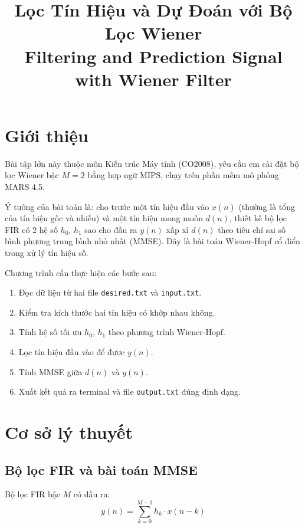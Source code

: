\documentclass[twoside,final]{hcmut-report}
\title{Lọc Tín Hiệu và Dự Đoán với Bộ Lọc Wiener\\
       \large Filtering and Prediction Signal with Wiener Filter}
\begin{document}
\coverpage%

\clearpage

\tableofcontents
\clearpage

\section{Giới thiệu}

Bài tập lớn này thuộc môn Kiến trúc Máy tính (CO2008), yêu cầu em
cài đặt bộ lọc Wiener bậc $M = 2$ bằng hợp ngữ MIPS, chạy trên phần mềm
mô phỏng MARS 4.5.

Ý tưởng của bài toán là: cho trước một tín hiệu đầu vào $x(n)$ (thường là
tổng của tín hiệu gốc và nhiễu) và một tín hiệu mong muốn $d(n)$, thiết kế
bộ lọc FIR có 2 hệ số $h_0$, $h_1$ sao cho đầu ra $y(n)$ xấp xỉ $d(n)$
theo tiêu chí sai số bình phương trung bình nhỏ nhất (MMSE). Đây là bài
toán Wiener-Hopf cổ điển trong xử lý tín hiệu số.

Chương trình cần thực hiện các bước sau:
\begin{enumerate}
  \item Đọc dữ liệu từ hai file \texttt{desired.txt} và \texttt{input.txt}.
  \item Kiểm tra kích thước hai tín hiệu có khớp nhau không.
  \item Tính hệ số tối ưu $h_0$, $h_1$ theo phương trình Wiener-Hopf.
  \item Lọc tín hiệu đầu vào để được $y(n)$.
  \item Tính MMSE giữa $d(n)$ và $y(n)$.
  \item Xuất kết quả ra terminal và file \texttt{output.txt} đúng định dạng.
\end{enumerate}

\section{Cơ sở lý thuyết}

\subsection{Bộ lọc FIR và bài toán MMSE}

Bộ lọc FIR bậc $M$ có đầu ra:
\begin{equation}
  y(n) = \sum_{k=0}^{M-1} h_k \cdot x(n-k)
\end{equation}
\end{document}
